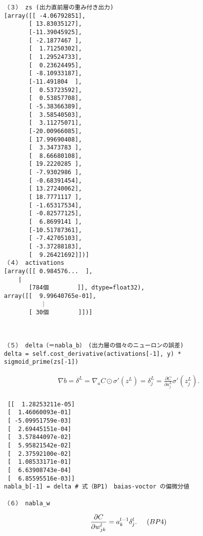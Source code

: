 \documentclass[11pt,a4j,fleqn]{jarticle}
\begin{document}
\begin{verbatim}
（３） zs (出力直前層の重み付き出力)
[array([[ -4.06792851],
       [ 13.83035127],
       [-11.39045925],
       [ -2.1877467 ],
       [  1.71250302],
       [  1.29524733],
       [  0.23624495],
       [ -8.10933187],
       [-11.491804  ],
       [  0.53723592],
       [  0.53857708],
       [ -5.38366389],
       [  3.58540503],
       [  3.11275071],
       [-20.00966085],
       [ 17.99690408],
       [  3.3473783 ],
       [  8.66680108],
       [ 19.2220285 ],
       [ -7.9302986 ],
       [ -0.68391454],
       [ 13.27240062],
       [ 18.7771117 ],
       [ -1.65317534],
       [ -0.82577125],
       [  6.8699141 ],
       [-10.51787361],
       [ -7.42705103],
       [ -3.37288183],
       [  9.26421692]])]
（４） activations
[array([[ 0.984576...  ],
	|
       [784個        ]], dtype=float32), 
array([[  9.99640765e-01],
       　　｜
       [ 30個　　　　　]])]



（５） delta（＝nabla_b）　(出力層の個々のニューロンの誤差)
delta = self.cost_derivative(activations[-1], y) *  sigmoid_prime(zs[-1]) 
\end{verbatim}
\begin{eqnarray}
\nabla b = {\delta}^{L} = \nabla_a C \odot \sigma'(z^L) =  \delta^L_j = \frac{\partial C}{\partial a^L_j}\sigma'(z^L_j). \nonumber \\
\end{eqnarray}
\begin{verbatim}
 [[  1.28253211e-05]
 [  1.46060093e-01]
 [ -5.09951759e-03]
 [  2.69445151e-04]
 [  3.57844097e-02]
 [  5.95821542e-02]
 [  2.37592100e-02]
 [  1.08533171e-01]
 [  6.63908743e-04]
 [  6.85595516e-03]]
nabla_b[-1] = delta # 式（BP1)　baias-voctor の偏微分値

（６） nabla_w
\end{verbatim}
\begin{eqnarray}
  \frac{\partial C}{\partial w^l_{jk}} = a^{l-1}_k \delta^l_j. \hspace{5mm} (BP4)  \nonumber 
\end{eqnarray}
\end{document}
